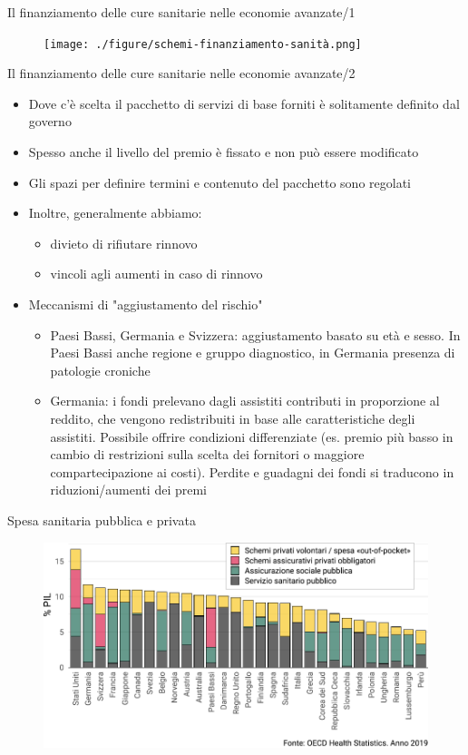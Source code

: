 \documentclass[aspectratio=149,11pt]{beamer}
\begin{document}
\begin{frame}{Il finanziamento delle cure sanitarie nelle economie avanzate/1}
\begin{figure}[htbp]
\centering
\texttt{[image: ./figure/schemi-finanziamento-sanità.png]}
\end{figure}
\end{frame}


\begin{frame}{Il finanziamento delle cure sanitarie nelle economie avanzate/2}
\begin{itemize}
\item Dove c’è scelta il pacchetto di servizi di base forniti è solitamente
definito dal governo
\item Spesso anche il livello del premio è fissato e non può essere modificato
\item Gli spazi per definire termini e contenuto del pacchetto sono regolati
\item Inoltre, generalmente abbiamo:
\begin{itemize}
\item divieto di rifiutare rinnovo
\item vincoli agli aumenti in caso di rinnovo
\end{itemize}
\item Meccanismi di "aggiustamento del rischio"
\begin{itemize}
\item Paesi Bassi, Germania e Svizzera: aggiustamento basato su età e sesso. In
Paesi Bassi anche regione e gruppo diagnostico, in Germania presenza di
patologie croniche
\item Germania: i fondi prelevano dagli assistiti contributi in proporzione al
reddito, che vengono redistribuiti in base alle caratteristiche degli
assistiti. Possibile offrire condizioni differenziate (es. premio più
basso in cambio di restrizioni sulla scelta dei fornitori o maggiore
compartecipazione ai costi). Perdite e guadagni dei fondi si traducono in
riduzioni/aumenti dei premi
\end{itemize}
\end{itemize}
\end{frame}

\begin{frame}{Spesa sanitaria pubblica e privata}
\begin{figure}[htbp]
\centering
\includegraphics[width=.95\textwidth]{./figure/spesa-sanitaria-per-schema-color.pdf}
\end{figure}
\end{frame}
\end{document}
